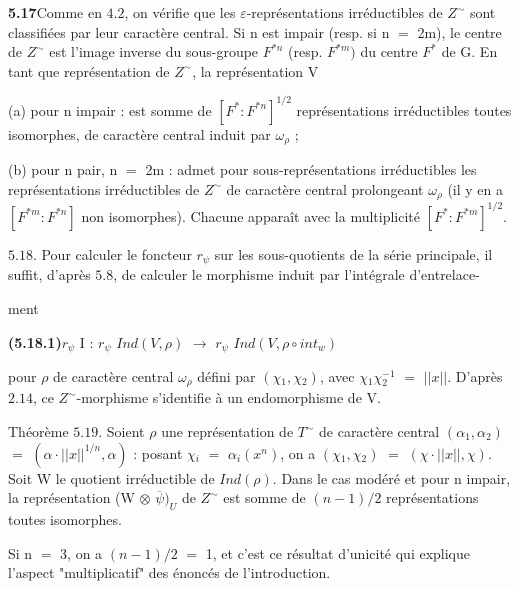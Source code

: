 \documentclass[10pt,a4paper]{article}
\begin{document}
\par\noindent\textbf{5.17}\quad Comme en $4.2$, on vérifie que les $\varepsilon{}$-représentations irréductibles de $Z^\sim$ sont classifiées par leur caractère central. Si n est impair (resp. si n $=$ 2m), le centre de $Z^\sim$ est l'image inverse du sous-groupe $F^{*n}$ (resp. $F^{*m})$ du centre $F^*$ de G. En tant que représentation de $Z^\sim$, la représentation V\par
\par (a) pour n impair : est somme de $[F^*:F^{*n}]^{1/2}$ représentations irréductibles toutes isomorphes, de caractère central induit par $\omega{}_\rho{}$ ;\par
\par (b) pour n pair, n $=$ 2m : admet pour sous-représentations irréductibles les représentations irréductibles de $Z^\sim$ de caractère central prolongeant $\omega{}_\rho{}$ (il y en a $[F^{*m}:F^{*n}]$ non isomorphes). Chacune apparaît avec la multiplicité $[F^*:F^{*m}]^{1/2}$.\par
\par $5.18$. Pour calculer le foncteur $r_\psi{}$ sur les sous-quotients de la série principale, il suffit, d'après $5.8$, de calculer le morphisme induit par l'intégrale d'entrelace-\par

\clearpage
{}
\label{d035-physical-027}
\par ment\par
\par\noindent\textbf{(5.18.1)}\quad $r_\psi{}$ I : $r_\psi{}$ $Ind(V,\rho{})$ $\to{}$ $r_\psi{}$ $Ind(V,\rho{}∘int_w)$\par
\par pour $\rho{}$ de caractère central $\omega{}_\rho{}$ défini par $(\chi{}_1,\chi{}_2)$, avec $\chi{}_1\chi{}_2^{-1}$ $=$ $||x||$. D'après $2.14$, ce $Z^\sim$-morphisme s'identifie à un endomorphisme de V.\par
\par Théorème $5.19$. Soient $\rho{}$ une représentation de $T^\sim$ de caractère central $(\alpha{}_1,\alpha{}_2)$ $=$ $(\alpha{}\cdot{}||x||^{1/n},\alpha{})$ : posant $\chi{}_i$ $=$ $\alpha{}_i(x^n)$, on a $(\chi{}_1,\chi{}_2)$ $=$ $(\chi{}\cdot{}||x||,\chi{})$. Soit W le quotient irréductible de $Ind(\rho{})$. Dans le cas modéré et pour n impair, la représentation (W $\otimes{}$ $\overline{\psi{}})_U$ de $Z^\sim$ est somme de $(n-1)/2$ représentations toutes isomorphes.\par
\par Si n $=$ 3, on a $(n-1)/2$ $=$ 1, et c'est ce résultat d'unicité qui explique l'aspect "multiplicatif" des énoncés de l'introduction.\par
\end{document}
